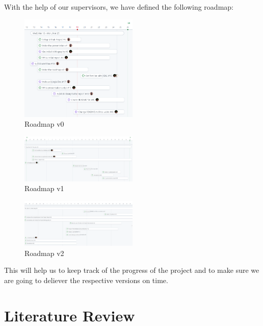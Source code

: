 \documentclass[12pt]{article}
\begin{document}
With the help of our supervisors, we have defined the following roadmap:

\begin{figure}[H]
    \centering
    \includegraphics[width=0.5\textwidth]{images/roadmap_v0.png}
    \caption{Roadmap v0}
\end{figure}

\begin{figure}[H]
    \centering
    \includegraphics[width=0.5\textwidth]{images/roadmap_v1.png}
    \caption{Roadmap v1}
\end{figure}

\begin{figure}[H]
    \centering
    \includegraphics[width=0.5\textwidth]{images/roadmap_v2.png}
    \caption{Roadmap v2}
\end{figure}

This will help us to keep track of the progress of the project and to make sure
we are going to deliever the respective versions on time.

\newpage
\section{Literature Review}
\end{document}
